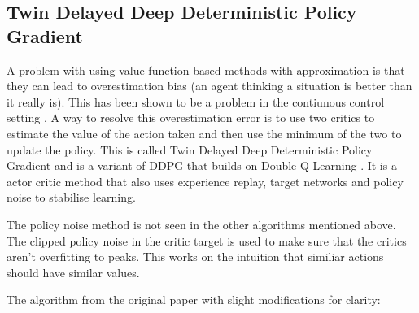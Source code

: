 \subsection{Twin Delayed Deep Deterministic Policy Gradient}\label{subsec:TD3}


A problem with using value function based methods with approximation is that they can lead to overestimation bias (an agent thinking a situation is better than it really is). This has been shown to be a problem in the contiunous control setting \cite{fujimotoAddressingFunctionApproximation2018}. A way to resolve this overestimation error is to use two critics to estimate the value of the action taken and then use the minimum of the two to update the policy. This is called Twin Delayed Deep Deterministic Policy Gradient \cite{fujimotoAddressingFunctionApproximation2018} and is a variant of DDPG \cite{lillicrapContinuousControlDeep2016} that builds on Double Q-Learning \cite{hasseltDeepReinforcementLearning2015}. It is a actor critic method that also uses experience replay, target networks and policy noise to stabilise learning.

The policy noise method is not seen in the other algorithms mentioned above. The clipped policy noise in the critic target is used to make sure that the critics aren't overfitting to peaks. This works on the intuition that similiar actions should have similar values.

The algorithm from the original paper \cite{fujimotoAddressingFunctionApproximation2018} with slight modifications for clarity:


